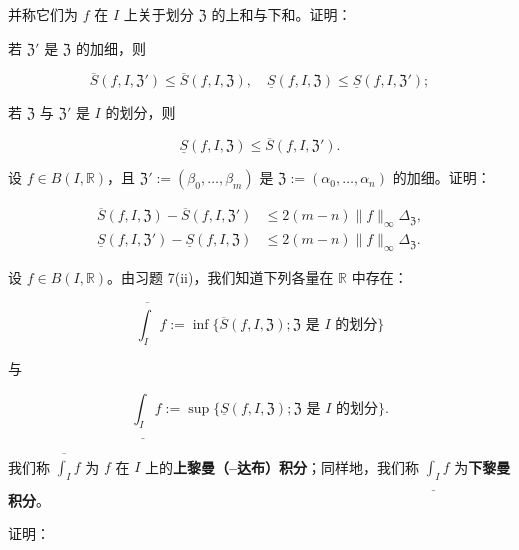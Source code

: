 \begin{exercises}
并称它们为 $ f $ 在 $ I $ 上关于划分 $ \mathfrak{Z} $ 的上和与下和。证明：

\begin{subitems}
\item

若 $ \mathfrak{Z}' $ 是 $ \mathfrak{Z} $ 的加细，则

\[
\overline{S}(f, I, \mathfrak{Z}') \le \overline{S}(f, I, \mathfrak{Z}) , \quad \underline{S}(f, I, \mathfrak{Z}) \le \underline{S}(f, I, \mathfrak{Z}') ;
\]
\item

若 $ \mathfrak{Z} $ 与 $ \mathfrak{Z}' $ 是 $ I $ 的划分，则

\[
\underline{S}(f, I, \mathfrak{Z}) \le \overline{S}(f, I, \mathfrak{Z}') .
\]
\end{subitems}

\item

设 $ f \in B(I, \mathbb{R}) $，且 $ \mathfrak{Z}' := (\beta_0, \ldots, \beta_m) $ 是 $ \mathfrak{Z} := (\alpha_0, \ldots, \alpha_n) $ 的加细。证明：

\begin{equation*}
\begin{aligned}
\overline{S}(f, I, \mathfrak{Z}) - \overline{S}(f, I, \mathfrak{Z}') &\le 2(m - n)\|f\|_{\infty}\Delta_{\mathfrak{Z}} , \\ \underline{S}(f, I, \mathfrak{Z}') - \underline{S}(f, I, \mathfrak{Z}) &\le 2(m - n)\|f\|_{\infty}\Delta_{\mathfrak{Z}} .
\end{aligned}
\end{equation*}
\item

设 $ f \in B(I, \mathbb{R}) $。由习题 7(ii)，我们知道下列各量在 $ \mathbb{R} $ 中存在：

\[
\overline{\int_{I}} f := \inf\{\overline{S}(f, I, \mathfrak{Z}) ; \mathfrak{Z} \text{ 是 } I \text{ 的划分}\}
\]

与

\[
\underline{\int_{I}} f := \sup\{\underline{S}(f, I, \mathfrak{Z}) ; \mathfrak{Z} \text{ 是 } I \text{ 的划分}\} .
\]

我们称 $ \overline{\int_{I}} f $ 为 $ f $ 在 $ I $ 上的\textbf{上黎曼（–达布）积分}；同样地，我们称 $ \underline{\int_{I}} f $ 为\textbf{下黎曼积分}。

证明：

\begin{subitems}
\item


\end{subitems}
\end{exercises}
